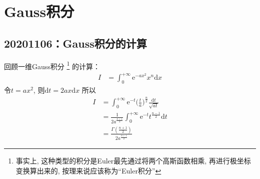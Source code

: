 \chapter{Gauss积分}
    \section{20201106：Gauss积分的计算}
        回顾一维Gauss积分
        \footnote{事实上, 这种类型的积分是Euler最先通过将两个高斯函数相乘, 
        再进行极坐标变换算出来的, 按理来说应该称为“Euler积分”}
        的计算：
        \begin{equation}
            \begin{aligned}
                I &= \int_0^{+\infty} \mathrm{e}^{-ax^2} x^{n} \mathrm{d}x
            \end{aligned}
        \end{equation}
        令$t = ax^2$, 则$\mathrm{d}t = 2ax\mathrm{d}x$
        所以
        \begin{equation}
            \begin{aligned}
                I &= \int_0^{+\infty} \mathrm{e}^{-t} \bigg(\frac ta\bigg)^{\frac n2} \frac {\mathrm{d}t}{\sqrt{at}}\\
                &= \frac 1{2a^{\frac {n+1}2}} \int_0^{+\infty} \mathrm{e}^{-t} t^{\frac {n-1}2} \mathrm{d}t\\
                &= \frac {\Gamma(\frac {n+1}2)}{2a^{\frac {n+1}2}}
            \end{aligned}
        \end{equation}

